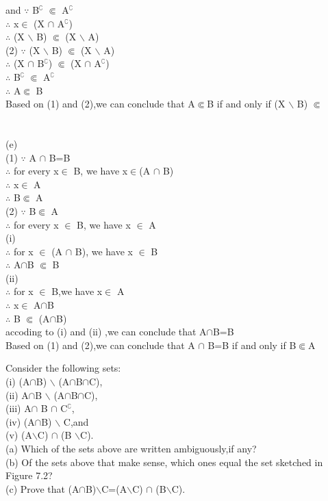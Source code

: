 \documentclass[11pt, a4paper, UTF8]{ctexart}
\begin{document}
\begin{solution}
and $\because$ B$^\complement$ $\Subset$ A$^\complement$\\
$\therefore$ x$\in$ (X $\cap$ A$^\complement$)\\
$\therefore$ (X $\backslash$ B) $\Subset$ (X $\backslash$ A)\\
(2) $\because$ (X $\backslash$ B) $\Subset$ (X $\backslash$ A)\\
$\therefore$ (X $\cap$ B$^\complement$) $\Subset$ (X $\cap$ A$^\complement$)\\
$\therefore$ B$^\complement$ $\Subset$ A$^\complement$\\
$\therefore$ A$\Subset$ B\\
Based on (1) and (2),we can conclude that A$\Subset$B if and only if (X $\backslash$ B) $\Subset$ \\
\\
\\
(e)\\
(1) $\because$ A $\cap$ B=B \\
$\therefore$ for every x$\in$ B, we have x$\in$(A $\cap$ B)\\
$\therefore$ x$\in$ A\\
$\therefore$ B$\Subset$ A\\
(2) $\because$ B$\Subset$ A\\
$\therefore$ for every x $\in$ B, we have x $\in$ A\\
\indent (i)\\
$\therefore$ for x $\in$ (A $\cap$ B), we have x $\in$ B\\
$\therefore$ A$\cap$B $\Subset$ B\\
\indent (ii)\\
$\therefore$ for x $\in$ B,we have x$\in$ A\\
$\therefore$ x$\in$ A$\cap$B\\
$\therefore$ B $\Subset$ (A$\cap$B)\\
accoding to (i) and (ii) ,we can conclude that A$\cap$B=B\\
Based on (1) and (2),we can conclude that A $\cap$ B=B if and only if B$\Subset$A\\

\end{solution}


\begin{problem}[UD:7.8]
Consider the following sets:\\
(i) (A$\cap$B) $\backslash$ (A$\cap$B$\cap$C),\\
(ii) A$\cap$B $\backslash$ (A$\cap$B$\cap$C),\\
(iii) A$\cap$ B $\cap$ C$^\complement$,\\
(iv) (A$\cap$B) $\backslash$ C,and\\
(v) (A$\backslash$C) $\cap$ (B $\backslash$C).\\
(a) Which of the sets above are written ambiguously,if any?\\
(b) Of the sets above that make sense, which ones equal the set sketched in Figure 7.2?\\
(c) Prove that (A$\cap$B)$\backslash$C=(A$\backslash$C) $\cap$ (B$\backslash$C).\\
\end{problem}
\end{document}
